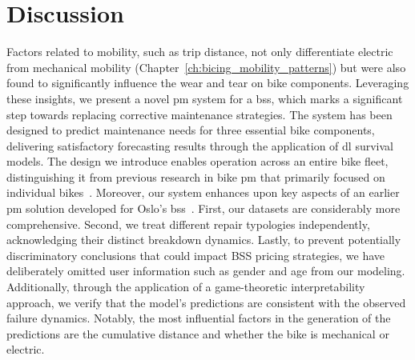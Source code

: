 \section{Discussion}
\label{sec:disc_maintenance}

Factors related to mobility, such as trip distance, not only differentiate electric from mechanical mobility (Chapter~\ref{ch:bicing_mobility_patterns}) but were also found to significantly influence the wear and tear on bike components. Leveraging these insights, we present a novel \ac{pm} system for a \ac{bss}, which marks a significant step towards replacing corrective maintenance strategies. The system has been designed to predict maintenance needs for three essential bike components, delivering satisfactory forecasting results through the application of \ac{dl} survival models. The design we introduce enables operation across an entire bike fleet, distinguishing it from previous research in bike \ac{pm} that primarily focused on individual bikes~\cite{MountainBike2019, Matkovic2021}. Moreover, our system enhances upon key aspects of an earlier \ac{pm} solution developed for Oslo's \ac{bss}~\cite{Gregoire2018}. First, our datasets are considerably more comprehensive. Second, we treat different repair typologies independently, acknowledging their distinct breakdown dynamics.  Lastly, to prevent potentially discriminatory conclusions that could impact BSS pricing strategies, we have deliberately omitted user information such as gender and age from our modeling. Additionally, through the application of a game-theoretic interpretability approach, we verify that the model's predictions are consistent with the observed failure dynamics. Notably, the most influential factors in the generation of the predictions are the cumulative distance and whether the bike is mechanical or electric.

